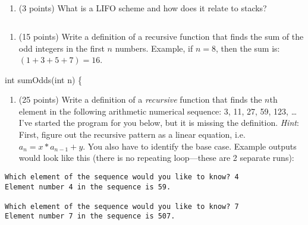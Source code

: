 \documentclass[
]{article}
\newenvironment{Shaded}{}{}
\newcommand{\DataTypeTok}[1]{\textcolor[rgb]{0.56,0.13,0.00}{#1}}
\newcommand{\NormalTok}[1]{#1}
\providecommand{\tightlist}{%
  \setlength{\itemsep}{0pt}\setlength{\parskip}{0pt}}
\begin{document}
\begin{verbatim}



\end{verbatim}

\begin{enumerate}
\def\labelenumi{\arabic{enumi}.}
\setcounter{enumi}{2}
\tightlist
\item
  (3 points) What is a LIFO scheme and how does it relate to stacks?
\end{enumerate}

\begin{verbatim}

\end{verbatim}

\begin{enumerate}
\def\labelenumi{\arabic{enumi}.}
\setcounter{enumi}{3}
\tightlist
\item
  (15 points) Write a definition of a recursive function that finds the
  sum of the odd integers in the first \(n\) numbers. Example, if
  \(n = 8\), then the sum is: \((1 + 3 + 5 + 7) = 16\).
\end{enumerate}

\begin{Shaded}
\begin{Highlighting}[]
\DataTypeTok{int}\NormalTok{ sumOdds(}\DataTypeTok{int}\NormalTok{ n)}
\NormalTok{\{}


\end{Highlighting}
\end{Shaded}

\pagebreak

\begin{enumerate}
\def\labelenumi{\arabic{enumi}.}
\setcounter{enumi}{4}
\tightlist
\item
  (25 points) Write a definition of a \emph{recursive} function that
  finds the \(n\)th element in the following arithmetic numerical
  sequence: 3, 11, 27, 59, 123, \ldots{} I've started the program for
  you below, but it is missing the definition. \emph{Hint}: First,
  figure out the recursive pattern as a linear equation,
  i.e.~\(a_n = x * a_{n-1} + y\). You also have to identify the base
  case. Example outputs would look like this (there is no repeating
  loop---these are 2 separate runs):
\end{enumerate}

\begin{verbatim}
Which element of the sequence would you like to know? 4
Element number 4 in the sequence is 59.

Which element of the sequence would you like to know? 7
Element number 7 in the sequence is 507.
\end{verbatim}
\end{document}
